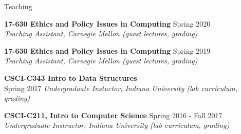 \documentclass{resume} %
\begin{document}
\newpage
\begin{rSection}{Teaching}

	{\bf 17-630 Ethics and Policy Issues in Computing} \hfill Spring 2020 \\ 
	\textit{Teaching Assistant, Carnegie Mellon (guest lectures, grading)} 
	
	{\bf 17-630 Ethics and Policy Issues in Computing} \hfill Spring 2019 \\ 
	\textit{Teaching Assistant, Carnegie Mellon (guest lectures, grading)} 

	{\bf CSCI-C343 Intro to Data Structures} \hfill  \\  Spring 2017
	\textit{Undergraduate Instuctor, Indiana University (lab curriculum, grading)} 

	{\bf CSCI-C211, Intro to Computer Science} \hfill Spring 2016 - Fall 2017 \\ 
	\textit{Undergraduate Instructor, Indiana University (lab curriculum, grading)} 

\end{rSection}
\end{document}
